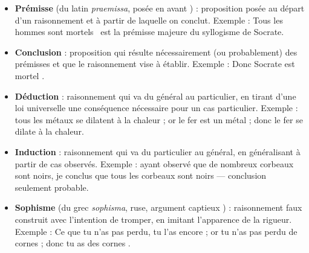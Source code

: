 \documentclass[11pt]{article}
\begin{document}
\begin{corrige}
\begin{itemize}
\item \textbf{Prémisse} (du latin \emph{praemissa}, \guillemotleft posée en avant \guillemotright) : proposition posée au départ d'un raisonnement et à partir de laquelle on conclut. Exemple : \guillemotleft Tous les hommes sont mortels \guillemotright\ est la prémisse majeure du syllogisme de Socrate.
\item \textbf{Conclusion} : proposition qui résulte nécessairement (ou probablement) des prémisses et que le raisonnement vise à établir. Exemple : \guillemotleft Donc Socrate est mortel \guillemotright.
\item \textbf{Déduction} : raisonnement qui va du général au particulier, en tirant d'une loi universelle une conséquence nécessaire pour un cas particulier. Exemple : tous les métaux se dilatent à la chaleur ; or le fer est un métal ; donc le fer se dilate à la chaleur.
\item \textbf{Induction} : raisonnement qui va du particulier au général, en généralisant à partir de cas observés. Exemple : ayant observé que de nombreux corbeaux sont noirs, je conclus que tous les corbeaux sont noirs --- conclusion seulement probable.
\item \textbf{Sophisme} (du grec \emph{sophisma}, \guillemotleft ruse, argument captieux \guillemotright) : raisonnement faux construit avec l'intention de tromper, en imitant l'apparence de la rigueur. Exemple : \guillemotleft Ce que tu n'as pas perdu, tu l'as encore ; or tu n'as pas perdu de cornes ; donc tu as des cornes \guillemotright.
\end{itemize}
\end{corrige}
\end{document}
